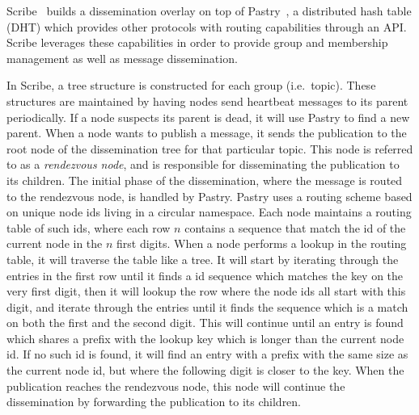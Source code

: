 Scribe~\cite{Castro:2002} builds a dissemination overlay on top of
Pastry~\cite{Rowstron:2001}, a distributed hash table (DHT) which provides other
protocols with routing capabilities through an API\@. Scribe leverages
these capabilities in order to provide group and membership management
as well as message dissemination.

In Scribe, a tree structure is constructed for each group (i.e.\ topic).
These structures are maintained by having nodes send heartbeat
messages to its parent periodically. If a node suspects its parent is
dead, it will use Pastry to find a new parent.  When a node wants to
publish a message, it sends the publication to the root node of the
dissemination tree for that particular topic. This node is referred to as
a \emph{rendezvous node}, and is responsible for disseminating the
publication to its children. The initial phase of the dissemination,
where the message is routed to the rendezvous node, is handled by
Pastry. Pastry uses a routing scheme based on unique node ids living in
a circular namespace. Each node maintains a routing table of such ids,
where each row $n$ contains a sequence that match the id of the current
node in the $n$ first digits. When a node performs a lookup in the
routing table, it will traverse the table like a tree. It will start by
iterating through the entries in the first row until it finds a id
sequence which matches the key on the very first digit, then it will
lookup the row where the node ids all start with this digit, and iterate
through the entries until it finds the sequence which is a match on both
the first and the second digit. This will continue until an entry is
found which shares a prefix with the lookup key which is longer than the
current node id. If no such id is found, it will find an entry with a
prefix with the same size as the current node id, but where the
following digit is closer to the key. When the publication reaches the
rendezvous node, this node will continue the dissemination by forwarding
the publication to its children.

